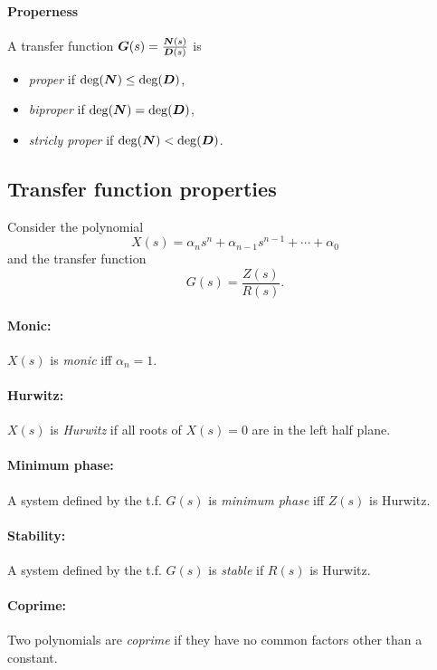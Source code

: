 \paragraph{Properness}
A transfer function $\bm{G}(s) = \frac{\bm{N}(s)}{\bm{D}(s)}$ is
\begin{itemize}
	\item \emph{proper} if $\deg(\bm{N}) \leq \deg(\bm{D})$,
	\item \emph{biproper} if $\deg(\bm{N}) = \deg(\bm{D})$,
	\item \emph{stricly proper} if $\deg(\bm{N}) < \deg(\bm{D})$.
\end{itemize}

\subsection{Transfer function properties}
Consider the polynomial
\begin{equation}
	X(s) = \alpha_n s^n + \alpha_{n-1} s^{n-1} + \cdots + \alpha_0
\end{equation}
and the transfer function
\begin{equation}
	G(s) = \frac{Z(s)}{R(s)}
	.
\end{equation}

\paragraph{Monic:} $X(s)$ is \emph{monic} iff $\alpha_n = 1$.

\paragraph{Hurwitz:} $X(s)$ is \emph{Hurwitz} if all roots of $X(s) = 0$ are in the left half plane.

\paragraph{Minimum phase:} A system defined by the t.f. $G(s)$ is \emph{minimum phase} iff $Z(s)$ is Hurwitz.

\paragraph{Stability:} A system defined by the t.f. $G(s)$ is \emph{stable} if $R(s)$ is Hurwitz.

\paragraph{Coprime:} Two polynomials are \emph{coprime} if they have no common factors other than a constant.

